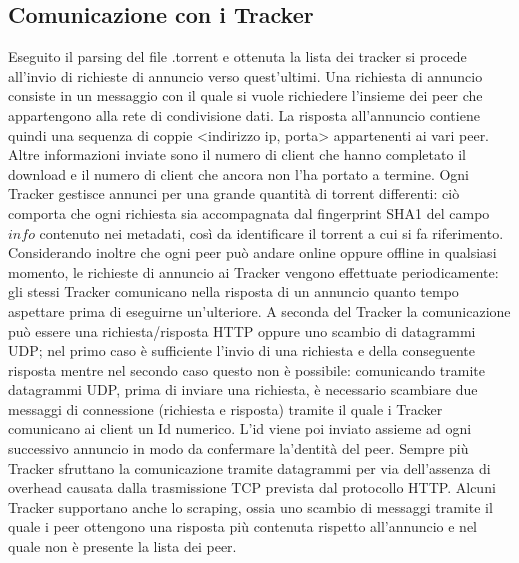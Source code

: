 \documentclass[a4]{book}
\begin{document}
\subsection{Comunicazione con i Tracker} 
Eseguito il parsing del file .torrent e ottenuta la lista dei tracker si procede all'invio di richieste di annuncio verso quest'ultimi. Una richiesta di annuncio consiste in un messaggio con il quale si vuole richiedere l'insieme dei peer che appartengono alla rete di condivisione dati.\newline
La risposta all'annuncio contiene quindi una sequenza di coppie <indirizzo ip, porta> appartenenti ai vari peer. Altre informazioni inviate sono il numero di client che hanno completato il download e il numero di client che ancora non l'ha portato a termine.\newline
Ogni Tracker gestisce annunci per una grande quantità di torrent differenti: ciò comporta che ogni richiesta sia accompagnata dal fingerprint SHA1 del campo $info$ contenuto nei metadati, così da identificare il torrent a cui si fa riferimento.\newline
Considerando inoltre che ogni peer può andare online oppure offline in qualsiasi momento, le richieste di annuncio ai Tracker vengono effettuate periodicamente: gli stessi Tracker comunicano nella risposta di un annuncio quanto tempo aspettare prima di eseguirne un'ulteriore.\newline\newline
A seconda del Tracker la comunicazione può essere una richiesta/risposta HTTP oppure uno scambio di datagrammi UDP; nel primo caso è sufficiente l'invio di una richiesta e della conseguente risposta mentre nel secondo caso questo non è possibile: comunicando tramite datagrammi UDP, prima di inviare una richiesta, è necessario scambiare due messaggi di connessione (richiesta e risposta) tramite il quale i Tracker comunicano ai client un Id numerico. L'id viene poi inviato assieme ad ogni successivo annuncio in modo da confermare la'dentità del peer.\newline
Sempre più Tracker sfruttano la comunicazione tramite datagrammi per via dell'assenza di overhead causata dalla trasmissione TCP prevista dal protocollo HTTP. \newline\newline
Alcuni Tracker supportano anche lo scraping, ossia uno scambio di messaggi tramite il quale i peer ottengono una risposta più contenuta rispetto all'annuncio e nel quale non è presente la lista dei peer.\newline\newline
\end{document}
